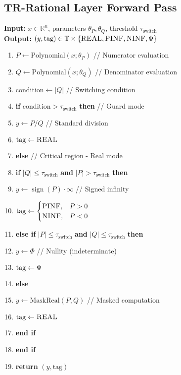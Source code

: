 \documentclass[twoside,11pt]{article}
\newcommand{\TR}{\mathbb{T}}
\newcommand{\trReal}{\textsc{REAL}}
\newcommand{\trPINF}{\textsc{PINF}}
\newcommand{\trNINF}{\textsc{NINF}}
\newcommand{\trPHI}{\textsc{$\Phi$}}
\newcommand{\TAGREAL}{\trReal}
\newcommand{\TAGPINF}{\trPINF}
\newcommand{\TAGNINF}{\trNINF}
\newcommand{\TAGPHI}{\trPHI}
\DeclareMathOperator{\sign}{sign}
\begin{document}

\subsection{TR-Rational Layer Forward Pass}

\begin{tcolorbox}[colback=gray!5!white,colframe=gray!75!black,title=\textbf{Algorithm \refstepcounter{algctr}\thealgctr: TR-Rational Layer Forward Pass}]
\label{alg:tr-forward}
\textbf{Input:} $x \in \mathbb{R}^n$, parameters $\theta_P, \theta_Q$, threshold $\tau_{\text{switch}}$ \\
\textbf{Output:} $ (y, \text{tag}) \in \TR \times \{\TAGREAL,\TAGPINF,\TAGNINF,\TAGPHI\} $

\begin{enumerate}
\item $P \leftarrow \text{Polynomial}(x; \theta_P)$ \hfill // Numerator evaluation
\item $Q \leftarrow \text{Polynomial}(x; \theta_Q)$ \hfill // Denominator evaluation  
\item $\text{condition} \leftarrow |Q|$ \hfill // Switching condition
\item \textbf{if} $\text{condition} > \tau_{\text{switch}}$ \textbf{then} \hfill // Guard mode
\item \quad $y \leftarrow P / Q$ \hfill // Standard division
\item \quad $\text{tag} \leftarrow \TAGREAL$
\item \textbf{else} \hfill // Critical region - Real mode
\item \quad \textbf{if} $|Q| \leq \tau_{\text{switch}}$ \textbf{and} $|P| > \tau_{\text{switch}}$ \textbf{then}
\item \quad \quad $y \leftarrow \sign(P)\cdot \infty$ \hfill // Signed infinity
\item \quad \quad $\text{tag} \leftarrow \begin{cases}\TAGPINF,& P>0\\ \TAGNINF,& P<0\end{cases}$
\item \quad \textbf{else if} $|P| \leq \tau_{\text{switch}}$ \textbf{and} $|Q| \leq \tau_{\text{switch}}$ \textbf{then}
\item \quad \quad $y \leftarrow \Phi$ \hfill // Nullity (indeterminate)
\item \quad \quad $\text{tag} \leftarrow \TAGPHI$
\item \quad \textbf{else}
\item \quad \quad $y \leftarrow \text{MaskReal}(P, Q)$ \hfill // Masked computation
\item \quad \quad $\text{tag} \leftarrow \TAGREAL$
\item \quad \textbf{end if}
\item \textbf{end if}
\item \textbf{return} $(y, \text{tag})$
\end{enumerate}
\end{tcolorbox}
\end{document}
